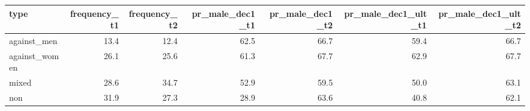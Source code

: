 
\begin{tabular}{l|r|r|r|r|r|r}
\hline
type & frequency\_t1 & frequency\_t2 & pr\_male\_dec1\_t1 & pr\_male\_dec1\_t2 & pr\_male\_dec1\_ult\_t1 & pr\_male\_dec1\_ult\_t2\\
\hline
against\_men & 13.4 & 12.4 & 62.5 & 66.7 & 59.4 & 66.7\\
\hline
against\_women & 26.1 & 25.6 & 61.3 & 67.7 & 62.9 & 67.7\\
\hline
mixed & 28.6 & 34.7 & 52.9 & 59.5 & 50.0 & 63.1\\
\hline
non & 31.9 & 27.3 & 28.9 & 63.6 & 40.8 & 62.1\\
\hline
\end{tabular}
